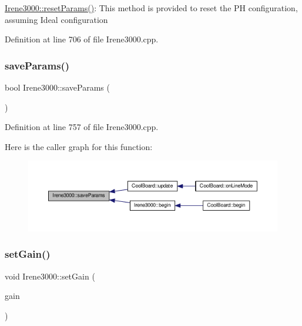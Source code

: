 \hyperlink{class_irene3000_a43b0e44f8d211413ff4e3a0c654205ff}{Irene3000\+::reset\+Params()}\+: This method is provided to reset the PH configuration, assuming Ideal configuration 

Definition at line 706 of file Irene3000.\+cpp.

\mbox{\label{class_irene3000_a63dbd38e79b8cd5f1fba4b245501a894}} 
\subsubsection{\texorpdfstring{save\+Params()}{saveParams()}}
{\footnotesize\ttfamily bool Irene3000\+::save\+Params (\begin{DoxyParamCaption}{ }\end{DoxyParamCaption})}



Definition at line 757 of file Irene3000.\+cpp.

Here is the caller graph for this function\+:\nopagebreak
\begin{figure}[H]
\begin{center}
\leavevmode
\includegraphics[width=350pt]{class_irene3000_a63dbd38e79b8cd5f1fba4b245501a894_icgraph}
\end{center}
\end{figure}
\mbox{\label{class_irene3000_aff7c5da186b388e7272e63ff88a20c34}} 
\subsubsection{\texorpdfstring{set\+Gain()}{setGain()}}
{\footnotesize\ttfamily void Irene3000\+::set\+Gain (\begin{DoxyParamCaption}\item[{\hyperlink{_cool_adafruit___a_d_s1015_8h_a3d6c0e15829a207b9155890811fa4781}{ads\+Gain\+\_\+t}}]{gain }\end{DoxyParamCaption})}

